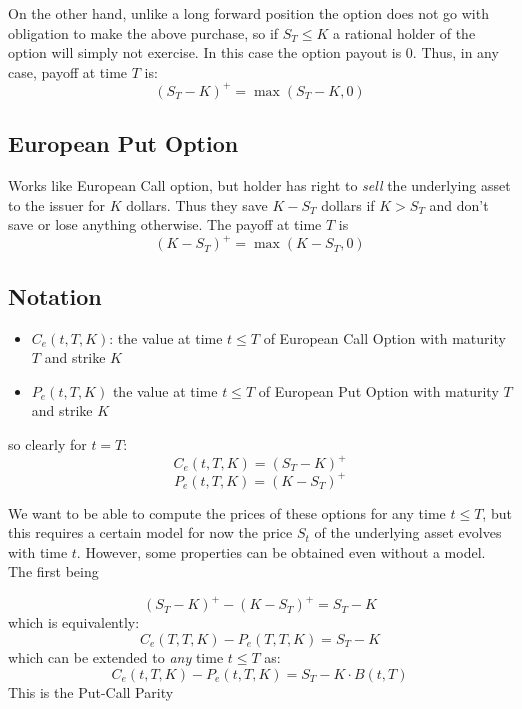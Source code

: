 \documentclass[oneside]{book}
\begin{document}
On the other hand, unlike a long forward position the option does not go with
obligation to make the above purchase, so if $S_T \leq K$ a rational holder
of the option will simply not exercise. In this case the option payout is $0$.
Thus, in any case, payoff at time $T$ is:
$$
(S_T-K)^+ = \max(S_T-K, 0)
$$
\subsection{European Put Option}
Works like European Call option, but holder has right to \textit{sell} the underlying
asset to the issuer for $K$ dollars. Thus they save $K-S_T$ dollars if $K>S_T$ and don't
save or lose anything otherwise. The payoff at time $T$ is
$$
(K-S_T)^+ = \max(K-S_T, 0)
$$
\subsection*{Notation}
\begin{itemize}
    \item $C_e(t,T,K)$: the value at time $t \leq T$ of European Call Option with
    maturity $T$ and strike $K$
    \item $P_e(t, T, K)$ the value at time $t \leq T$ of European Put Option with maturity
    $T$ and strike $K$
\end{itemize}
so clearly for $t=T$:
$$
    C_e(t,T,K) = (S_T-K)^+
$$
$$
    P_e(t,T,K) = (K-S_T)^+
$$

We want to be able to compute the prices of these options for any time $t \leq T$, but this
requires a certain model for now the price $S_t$ of the underlying asset evolves with time $t$. However, some properties can be obtained even without a model. The first being

$$
    (S_T-K)^+ - (K-S_T)^+ = S_T - K
$$
which is equivalently:
$$
    C_e(T,T,K) - P_e(T, T, K) = S_T - K
$$
which can be extended to \textit{any} time $t \leq T$ as:
$$
    C_e(t,T,K) - P_e(t, T, K) = S_T - K \cdot B(t, T)
$$
{\color{red} This is the Put-Call Parity}
\end{document}

